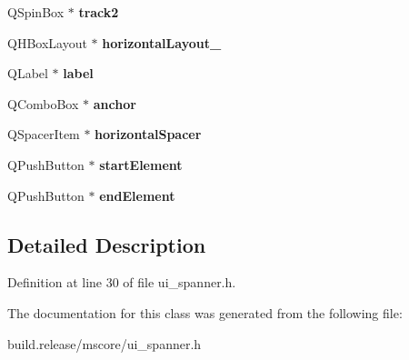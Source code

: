 \begin{DoxyCompactItemize}
\item 
\mbox{\label{class_ui___spanner_base_a258de6203a7a82f686cc18579b5ab593}} 
Q\+Spin\+Box $\ast$ {\bfseries track2}
\item 
\mbox{\label{class_ui___spanner_base_aa574115c5bc784b2285b52e7e9b70f09}} 
Q\+H\+Box\+Layout $\ast$ {\bfseries horizontal\+Layout\+\_}
\item 
\mbox{\label{class_ui___spanner_base_abfcd3aca8a121fa6af1a3b41bd40bc61}} 
Q\+Label $\ast$ {\bfseries label}
\item 
\mbox{\label{class_ui___spanner_base_a6e092f4226bea6f96faf5bbe00930405}} 
Q\+Combo\+Box $\ast$ {\bfseries anchor}
\item 
\mbox{\label{class_ui___spanner_base_a04f639c3769c53ee99dbe0d4775236f5}} 
Q\+Spacer\+Item $\ast$ {\bfseries horizontal\+Spacer}
\item 
\mbox{\label{class_ui___spanner_base_a4da63a76faf5795d6fbb0d5ae511b847}} 
Q\+Push\+Button $\ast$ {\bfseries start\+Element}
\item 
\mbox{\label{class_ui___spanner_base_ac388a56e3bb6bde22c913880a743c106}} 
Q\+Push\+Button $\ast$ {\bfseries end\+Element}
\end{DoxyCompactItemize}


\subsection{Detailed Description}


Definition at line 30 of file ui\+\_\+spanner.\+h.



The documentation for this class was generated from the following file\+:\begin{DoxyCompactItemize}
\item 
build.\+release/mscore/ui\+\_\+spanner.\+h\end{DoxyCompactItemize}
